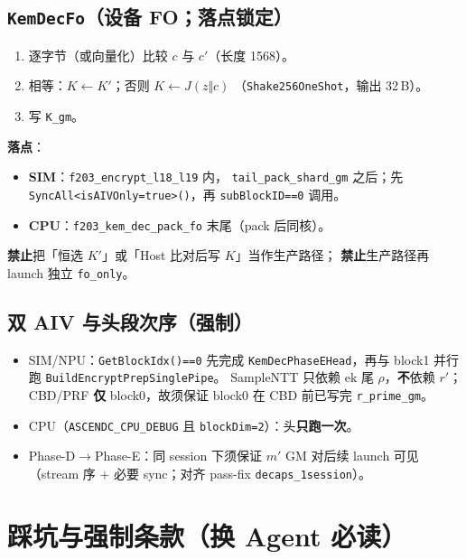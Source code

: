 \documentclass[UTF8,a4paper,11pt]{ctexart}
\begin{document}
\subsection{\texttt{KemDecFo}（设备 FO；落点锁定）}

\begin{enumerate}
  \item 逐字节（或向量化）比较 $c$ 与 $c'$（长度 1568）。
  \item 相等：$K\leftarrow K'$；否则 $K\leftarrow J(z\Vert c)$
        （\texttt{Shake256OneShot}，输出 32\,B）。
  \item 写 \texttt{K\_gm}。
\end{enumerate}

\textbf{落点}：
\begin{itemize}
  \item \textbf{SIM}：\texttt{f203\_encrypt\_l18\_l19} 内，
        \texttt{tail\_pack\_shard\_gm} 之后；先
        \texttt{SyncAll<isAIVOnly=true>()}，再 \texttt{subBlockID==0} 调用。
  \item \textbf{CPU}：\texttt{f203\_kem\_dec\_pack\_fo} 末尾（pack 后同核）。
\end{itemize}

\textbf{禁止}把「恒选 $K'$」或「Host 比对后写 $K$」当作生产路径；
\textbf{禁止}生产路径再 launch 独立 \texttt{fo\_only}。

\subsection{双 AIV 与头段次序（强制）}

\begin{itemize}
  \item SIM/NPU：\texttt{GetBlockIdx()==0} 先完成 \texttt{KemDecPhaseEHead}，再与
        block1 并行跑 \texttt{BuildEncryptPrepSinglePipe}。
        SampleNTT 只依赖 $\mathrm{ek}$ 尾 $\rho$，\textbf{不}依赖 $r'$；
        CBD/PRF \textbf{仅} block0，故须保证 block0 在 CBD 前已写完
        \texttt{r\_prime\_gm}。
  \item CPU（\texttt{ASCENDC\_CPU\_DEBUG} 且 \texttt{blockDim=2}）：头\textbf{只跑一次}。
  \item Phase-D$\to$Phase-E：同 session 下须保证 $m'$ GM 对后续 launch 可见
        （stream 序 + 必要 sync；对齐 pass-fix \texttt{decaps\_1session}）。
\end{itemize}

\section{踩坑与强制条款（换 Agent 必读）}
\label{sec:landmines}
\end{document}
